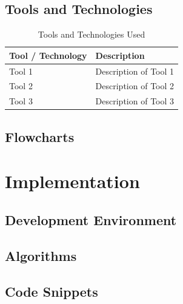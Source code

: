\documentclass[12pt,a4paper]{report}
\numberwithin{equation}{chapter}
\begin{document}
\section{Tools and Technologies}
\begin{table}[H]
\centering
\caption{Tools and Technologies Used}
\label{tab:tools}
\begin{tabular}{|p{4.5cm}|p{10cm}|}
\hline
\textbf{Tool / Technology} & \textbf{Description} \\
\hline
Tool 1 & Description of Tool 1 \\
\hline
Tool 2 & Description of Tool 2 \\
\hline
Tool 3 & Description of Tool 3 \\
\hline
\end{tabular}
\end{table}

\section{Flowcharts}

\chapter{Implementation}
\label{ch:implementation}


\section{Development Environment}

\section{Algorithms}

\section{Code Snippets}
\end{document}
